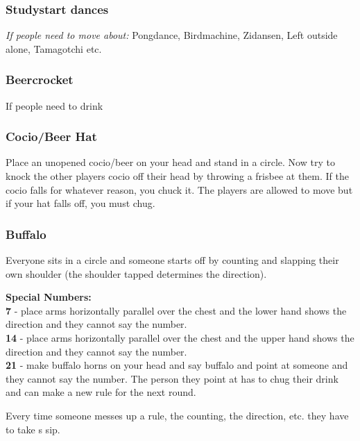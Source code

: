 \documentclass[../../../main.tex]{subfiles}
\begin{document}
\begin{multicols}{2}
\subsubsection*{Studystart dances}
    \textit{If people need to move about:}
    Pongdance, Birdmachine, Zidansen, Left outside alone, Tamagotchi etc.
    
\subsubsection*{Beercrocket}
    If people need to drink

\subsubsection*{Cocio/Beer Hat}

Place an unopened cocio/beer on your head and stand in a circle.  Now try to knock the other players cocio off their head by throwing a frisbee at them. If the cocio falls for whatever reason, you chuck it. The players are allowed to move but if your hat falls off, you must chug.

\subsubsection*{Buffalo}

Everyone sits in a circle and someone starts off by counting and slapping their own shoulder (the shoulder tapped determines the direction).\\\vspace{1em}

\textbf{Special Numbers:}\\
\textbf{7} - place arms horizontally parallel over the chest and the lower hand shows the direction and they cannot say the number.\\
\textbf{14} - place arms horizontally parallel over the chest and the upper hand shows the direction and they cannot say the number.\\
\textbf{21} - make buffalo horns on your head and say buffalo and point at someone and they cannot say the number. The person they point at has to chug their drink and can make a new rule for the next round.\\\vspace{1em}

Every time someone messes up a rule, the counting, the direction, etc. they have to take s sip.



\end{multicols}
\end{document}
